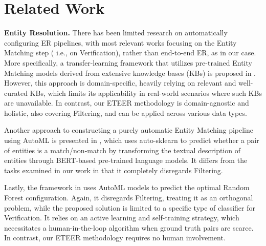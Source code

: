 \section{Related Work}\label{sec:related_work}


\textbf{Entity Resolution.} There has been limited research on automatically configuring 
ER pipelines, with most relevant works
focusing on the Entity Matching step ( i.e., on Verification), rather than end-to-end ER, as in our case. More specifically, 
a transfer-learning framework that utilizes pre-trained Entity Matching models derived from extensive knowledge bases (KBs) is proposed in \cite{AutoER_WWW}. However, this approach is domain-specific, heavily relying on relevant and well-curated KBs, which limits its applicability in real-world scenarios where such KBs are unavailable. In contrast, our ETEER methodology is domain-agnostic and holistic, also covering Filtering, and can be applied across various data types. 

Another approach to constructing a purely automatic 
Entity Matching pipeline using AutoML is presented in \cite{AutoER_EDBT}, which uses auto-sklearn to predict whether a pair of entities is a match/non-match by transforming the textual description of entities through BERT-based pre-trained language models. It differs from the tasks examined in our work in that it completely disregards Filtering.

Lastly, the 
framework in \cite{AutoER_ICDE}
uses AutoML models to predict the optimal Random Forest configuration. Again, it disregards Filtering, treating it as an orthogonal problem, while the proposed solution %
is limited to a specific type of classifier for Verification. It relies on an active learning and self-training strategy, which necessitates a human-in-the-loop algorithm when ground truth pairs are scarce. In contrast, our ETEER methodology requires no human involvement.

